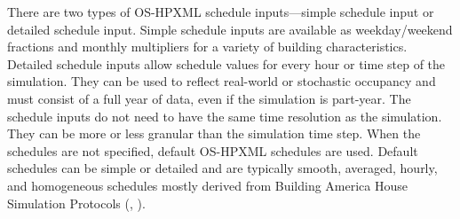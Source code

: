 There are two types of OS-HPXML schedule inputs---simple schedule input or detailed schedule input. Simple schedule inputs are available as weekday/weekend fractions and monthly multipliers for a variety of building characteristics. Detailed schedule inputs allow schedule values for every hour or time step of the simulation. They can be used to reflect real-world or stochastic occupancy and must consist of a full year of data, even if the simulation is part-year. The schedule inputs do not need to have the same time resolution as the simulation. They can be more or less granular than the simulation time step. When the schedules are not specified, default OS-HPXML schedules are used. Default schedules can be simple or detailed and are typically smooth, averaged, hourly, and homogeneous schedules mostly derived from Building America House Simulation Protocols (\cite{bahsp_2010}, \cite{bahsp_2014}).



